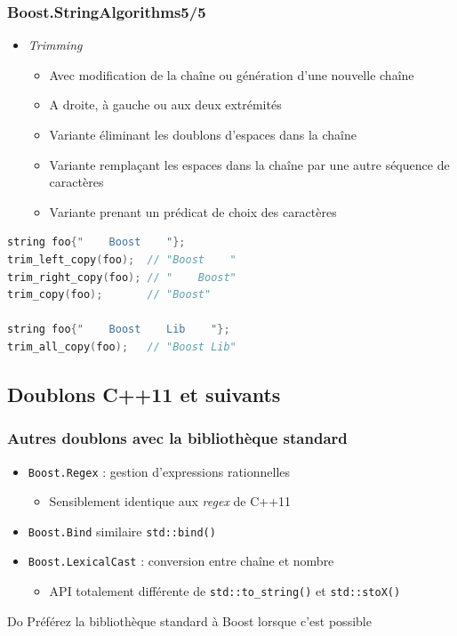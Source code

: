 \documentclass[C++.tex]{subfiles}
\begin{document}
\begin{frame}[fragile]
	\frametitle{Boost.StringAlgorithms\titlehfill{}5/5}
	\begin{itemize}
		\item \textit{Trimming}
		\begin{itemize}
			\item Avec modification de la chaîne ou génération d'une nouvelle chaîne
			\item A droite, à gauche ou aux deux extrémités
			\item Variante éliminant les doublons \og d'espaces\fg{} dans la chaîne
			\item Variante remplaçant les \og espaces\fg{} dans la chaîne par une autre séquence de caractères
			\item Variante prenant un prédicat de choix des caractères
		\end{itemize}
	\end{itemize}

	\begin{lstlisting}[language=C++]
string foo{"    Boost    "};
trim_left_copy(foo);  // "Boost    "
trim_right_copy(foo); // "    Boost"
trim_copy(foo);       // "Boost"

string foo{"    Boost    Lib    "};
trim_all_copy(foo);   // "Boost Lib"\end{lstlisting}
\end{frame}

\subsection*{Doublons C++11 et suivants}
\begin{frame}[fragile]
	\frametitle{Autres doublons avec la bibliothèque standard}
	\begin{itemize}
		\item \lstinline|Boost.Regex| : gestion d'expressions rationnelles
		\begin{itemize}
			\item Sensiblement identique aux \textit{regex} de C++11
		\end{itemize}
		\item \lstinline|Boost.Bind| similaire \lstinline|std::bind()|
		\item \lstinline|Boost.LexicalCast| : conversion entre chaîne et nombre
		\begin{itemize}
			\item API totalement différente de \lstinline|std::to_string()| et \lstinline|std::stoX()|
		\end{itemize}
	\end{itemize}

	\begin{exampleblock}{Do}
		Préférez la bibliothèque standard à Boost lorsque c'est possible
	\end{exampleblock}
\end{frame}
\end{document}
